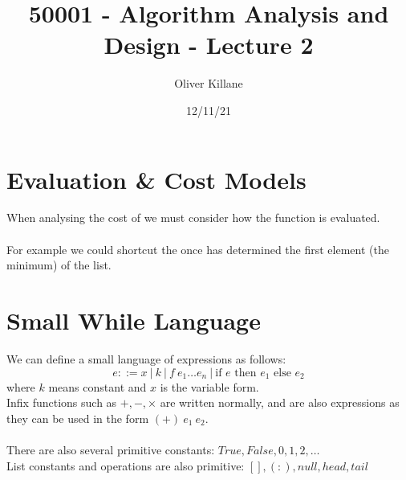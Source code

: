 \documentclass{report}
\title{50001 - Algorithm Analysis and Design - Lecture 2}
\author{Oliver Killane}
\date{12/11/21}
\newcommand{\cond}[3]{\text{if } #1 \text{ then } #2 \text{ else } #3}
\begin{document}
\maketitle
{}

\section*{Evaluation \& Cost Models}
When analysing the cost of  we must consider how the function is evaluated.
\\
\\ For example we could shortcut the once  has determined the first element (the minimum) of the list.
\\

\section*{Small While Language}
We can define a small language of expressions as follows:
\[e ::= x \ | \ k \ | \ f \ e_1 \dots e_n \ | \ \cond{e}{e_1}{e_2}\]
where $k$ means constant and $x$ is the variable form.
\\ Infix functions such as $+, -, \times$ are written normally, and are also expressions as they can be used in the form $(+) \ e_1 \ e_2$.
\\
\\ There are also several primitive constants: $True, False, 0, 1, 2, \dots$
\\ List constants and operations are also primitive: $[], (:), null, head, tail$
\end{document}
